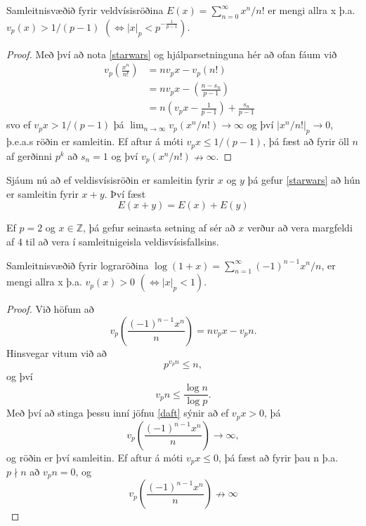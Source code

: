 \begin{setn}
Samleitnisvæðið fyrir veldvísisröðina $E(x) = \sum_{n=0}^{\infty} x^n/n!$ er mengi allra x þ.a.
$v_p(x)>1/(p-1)$  $(\iff |x|_p < p^{- \frac{1}{p-1}} )$.
\end{setn}
\begin{proof}
Með því að nota \ref{starwars} og hjálparsetninguna hér að ofan fáum við
\begin{align*}
v_p \left( \frac{x^n}{n!} \right) & =  n v_p x - v_p(n!) & \\
 & =  n v_p x - \left( \frac{n - s_n}{p-1} \right) &\\ 
 & =  n \left( v_p x - \frac{1}{p-1} \right) + \frac{s_n}{p-1}&
\end{align*}
svo ef $v_p x > 1/(p-1)$ þá $\lim_{n\rightarrow \infty } v_p (x^n/n!) \rightarrow \infty$ 
og því $|x^n/n!|_p \rightarrow 0$, þ.e.a.s röðin er samleitin.
Ef aftur á móti $v_px \leq 1/(p-1)$, þá fæst að fyrir öll $n$ af gerðinni $p^k$ að $s_n = 1$ og því $v_p(x^n/n!) \nrightarrow \infty$.
\end{proof}

Sjáum nú að ef veldisvísisröðin er samleitin fyrir $x$ og $y$ þá gefur \ref{starwars} að hún er samleitin fyrir $x+y$. Því fæst
\begin{equation*}
E(x+y) = E(x) + E(y)
\end{equation*}

\begin{daemi}
Ef $p=2$ og $x \in \mathbb{Z}$, þá gefur seinasta setning af sér að $x$ verður að vera margfeldi af 4 til að vera í samleitnigeisla veldisvísisfallsins. 
\end{daemi}

\begin{setn}
Samleitnisvæðið fyrir lograröðina $\log(1+x) = \sum_{n=1}^{\infty} (-1)^{n-1}x^n/n$, er mengi allra x þ.a. $v_p(x)>0$  $(\iff |x|_p<1)$.
\end{setn}
\begin{proof}
Við höfum að 
\begin{equation} \label{daft}
v_p \left( \frac{(-1)^{n-1}x^n}{n} \right) = n v_px - v_p n.
\end{equation}
Hinsvegar vitum við að 
\begin{equation*}
p^{v_p n} \leq n,
\end{equation*}
og því 
\begin{equation*}
v_p n \leq \frac{\log n}{\log p}.
\end{equation*}
Með því að stinga þessu inní jöfnu \ref{daft} sýnir að ef $v_p x> 0$, þá
\begin{equation*}
v_p \left( \frac{(-1)^{n-1}x^n}{n} \right) \rightarrow \infty,
\end{equation*}
og röðin er því samleitin. Ef aftur á móti $v_p x \leq 0$, þá fæst að fyrir þau n þ.a. $p \nmid n $ að $v_pn=0$, og
\begin{equation*}
v_p \left( \frac{(-1)^{n-1}x^n}{n} \right) \nrightarrow \infty
\end{equation*}
\end{proof}

